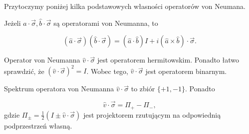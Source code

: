 Przytoczymy poniżej kilka podstawowych własności operatorów von Neumana.

\begin{theorem}
    Jeżeli $\hat{a} \cdot \vec{\sigma}, \hat{b} \cdot \vec{\sigma}$ są operatorami von Neumanna, to

    $$
        (\hat{a} \cdot \vec{\sigma}) (\hat{b} \cdot \vec{\sigma}) = \left(\hat{a} \cdot \hat{b} \right) I + i \left(\hat{a} \times \hat{b}\right) \cdot \vec{\sigma}.
    $$
\end{theorem}

\begin{fact}
    Operator von Neumanna $\hat{v} \cdot \vec{\sigma}$ jest operatorem hermitowskim. Ponadto łatwo sprawdzić, że $\left(\hat{v} \cdot \vec{\sigma}\right) ^ 2 = I$. Wobec tego, $\hat{v} \cdot \vec{\sigma}$ jest operatorem binarnym.
\end{fact}

\begin{fact}
    Spektrum operatora von Neumanna $\hat{v} \cdot \vec{\sigma}$ to zbiór $\{+1, -1\}$. Ponadto

    $$
    \hat{v} \cdot \vec{\sigma} = \Pi_{+} - \Pi_{-},
    $$
    gdzie $\Pi_{\pm} = \frac{1}{2} (I \pm \hat{v} \cdot \vec{\sigma})$ jest projektorem rzutującym na odpowiednią podprzestrzeń własną.
\end{fact}
